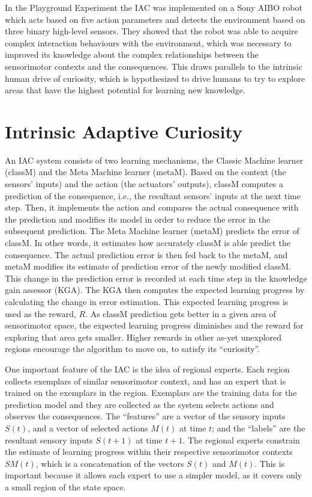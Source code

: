 In the Playground Experiment \cite{Oudeyer2005} the IAC was implemented on a Sony AIBO robot which acts based on five action parameters and detects the environment based on three binary high-level sensors. They showed that the robot was able to acquire complex interaction behaviours with the environment, which was necessary to improved its knowledge about the complex relationships between the sensorimotor contexts and the consequences. This draws parallels to the intrinsic human drive of curiosity, which is hypothesized to drive humans to try to explore areas that have the highest potential for learning new knowledge.
 
\section{Intrinsic Adaptive Curiosity}

An IAC system \cite{Oudeyer2007} consists of two learning mechanisms, the Classic Machine learner (classM) and the Meta Machine learner (metaM). Based on the context (the sensors' inputs) and the action (the actuators' outputs), classM computes a prediction of the consequence, i.e., the resultant sensors' inputs at the next time step. Then, it implements the action and compares the actual consequence with the prediction and modifies its model in order to reduce the error in the subsequent prediction. The Meta Machine learner (metaM) predicts the error of classM. In other words, it estimates how accurately classM is able predict the consequence. The actual prediction error is then fed back to the metaM, and metaM modifies its estimate of prediction error of the newly modified classM. This change in the prediction error is recorded at each time step in the knowledge gain assessor (KGA). The KGA then computes the expected learning progress by calculating the change in error estimation. This expected learning progress is used as the reward, $R$. As classM prediction gets better in a given area of sensorimotor space, the expected learning progress diminishes and the reward for exploring that area gets smaller. Higher rewards in other as-yet unexplored regions encourage the algorithm to move on, to satisfy its ``curiosity''. 

One important feature of the IAC is the idea of regional experts. Each region collects exemplars of similar sensorimotor context, and has an expert that is trained on the exemplars in the region. Exemplars are the training data for the prediction model and they are collected as the system selects actions and observes the consequences. The ``features'' are a vector of the sensory inputs $S(t)$, and a vector of selected actions $M(t)$ at time $t$; and the ``labels'' are the resultant sensory inputs $S(t+1)$ at time $t+1$. The regional experts constrain the estimate of learning progress within their respective sensorimotor contexts $SM(t)$, which is a concatenation of the vectors $S(t)$ and $M(t)$. This is important because it allows each expert to use a simpler model, as it covers only a small region of the state space.  

